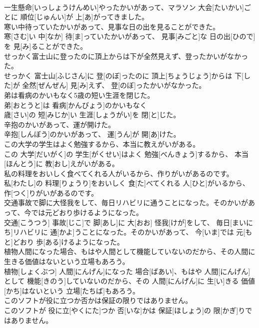 \documentclass[8pt]{extreport}
\begin{document}
\begin{CJK}{UTF8}{min}
\\	一生懸命[いっしょうけんめい]やったかいがあって、マラソン 大会[たいかい]ごとに 順位[じゅんい]が 上[あ]がってきました。
\\	寒い中待っていたかいがあって、見事な日の出を見ることができた。	
\\	寒[さむ]い 中[なか] 待[ま]っていたかいがあって、 見事[みごと]な 日の出[ひので]を 見[み]ることができた。
\\	せっかく富士山に登ったのに頂上からは下が全然見えず、登ったかいがなかった。	
\\	せっかく 富士山[ふじさん]に 登[のぼ]ったのに 頂上[ちょうじょう]からは 下[した]が 全然[ぜんぜん] 見[み]えず、 登[のぼ]ったかいがなかった。
\\	弟は看病のかいもなく5歳の短い生涯を閉じた。	
\\	弟[おとうと]は 看病[かんびょう]のかいもなく 
\\	歳[さい]の 短[みじか]い 生涯[しょうがい]を 閉[と]じた。
\\	辛抱のかいがあって、運が開けた。	
\\	辛抱[しんぼう]のかいがあって、 運[うん]が 開[あ]けた。
\\	この大学の学生はよく勉強するから、本当に教えがいがある。	
\\	この 大学[だいがく]の 学生[がくせい]はよく 勉強[べんきょう]するから、 本当[ほんとう]に 教[おし]えがいがある。
\\	私の料理をおいしく食べてくれる人がいるから、作りがいがあるのです。	
\\	私[わたし]の 料理[りょうり]をおいしく 食[た]べてくれる 人[ひと]がいるから、 作[つく]りがいがあるのです。
\\	交通事故で脚に大怪我をして、毎日リハビリに通うことになった。そのかいがあって、今では元どおり歩けるようになった。	
\\	交通[こうつう] 事故[じこ]で 脚[あし]に 大[おお] 怪我[けが]をして、 毎日[まいにち]リハビリに 通[かよ]うことになった。そのかいがあって、 今[いま]では 元[もと]どおり 歩[ある]けるようになった。
\\	植物人間になった場合、もはや人間として機能していないのだから、その人間に生きる価値はないという立場もあろう。	
\\	植物[しょくぶつ] 人間[にんげん]になった 場合[ばあい]、もはや 人間[にんげん]として 機能[きのう]していないのだから、その 人間[にんげん]に 生[い]きる 価値[かち]はないという 立場[たちば]もあろう。
\\	このソフトが役に立つか否かは保証の限りではありません。	
\\	このソフトが 役に立[やくにた]つか 否[いな]かは 保証[ほしょう]の 限[かぎ]りではありません。

\end{CJK}
\end{document}
